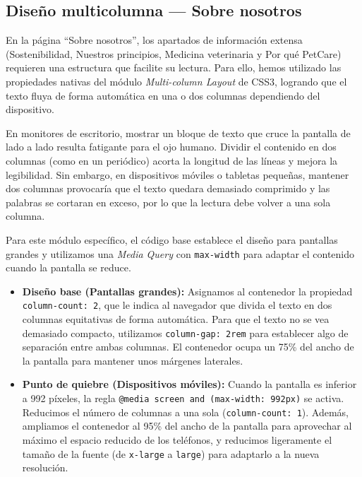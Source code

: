 \documentclass[11pt]{article}
\begin{document}
\clearpage

\subsection{Diseño multicolumna --- Sobre nosotros}

En la página ``Sobre nosotros'', los apartados de información extensa (Sostenibilidad, Nuestros principios, Medicina veterinaria y Por qué PetCare) requieren una estructura que facilite su lectura. Para ello, hemos utilizado las propiedades nativas del módulo \textit{Multi-column Layout} de CSS3, logrando que el texto fluya de forma automática en una o dos columnas dependiendo del dispositivo.

En monitores de escritorio, mostrar un bloque de texto que cruce la pantalla de lado a lado resulta fatigante para el ojo humano. Dividir el contenido en dos columnas (como en un periódico) acorta la longitud de las líneas y mejora la legibilidad. Sin embargo, en dispositivos móviles o tabletas pequeñas, mantener dos columnas provocaría que el texto quedara demasiado comprimido y las palabras se cortaran en exceso, por lo que la lectura debe volver a una sola columna.

Para este módulo específico, el código base establece el diseño para pantallas grandes y utilizamos una \textit{Media Query} con \texttt{max-width} para adaptar el contenido cuando la pantalla se reduce.

\begin{itemize}
\item \textbf{Diseño base (Pantallas grandes):} Asignamos al contenedor la propiedad \texttt{column-count: 2}, que le indica al navegador que divida el texto en dos columnas equitativas de forma automática. Para que el texto no se vea demasiado compacto, utilizamos \texttt{column-gap: 2rem} para establecer algo de separación entre ambas columnas. El contenedor ocupa un 75\% del ancho de la pantalla para mantener unos márgenes laterales.
\item \textbf{Punto de quiebre (Dispositivos móviles):} Cuando la pantalla es inferior a 992 píxeles, la regla \texttt{@media screen and (max-width: 992px)} se activa. Reducimos el número de columnas a una sola (\texttt{column-count: 1}). Además, ampliamos el contenedor al 95\% del ancho de la pantalla para aprovechar al máximo el espacio reducido de los teléfonos, y reducimos ligeramente el tamaño de la fuente (de \texttt{x-large} a \texttt{large}) para adaptarlo a la nueva resolución.
\end{itemize}
\end{document}
